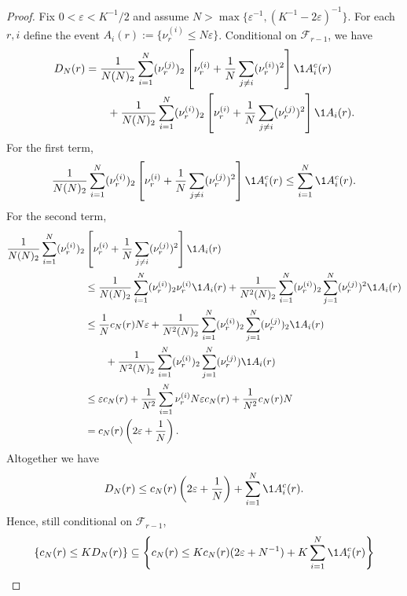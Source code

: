 \begin{proof}
Fix $0 < \varepsilon < K^{-1}/2$ and assume $N > \max\{ \varepsilon^{-1}, (K^{-1} - 2\varepsilon)^{-1} \}$. For each $r,i$ define the event $A_i(r) := \{ \nu_r^{(i)} \leq N\varepsilon \}$.
Conditional on $\mathcal{F}_{r-1}$, we have
\begin{align*}
D_N(r)
&= \frac{1}{N(N)_2} \sum_{i=1}^N (\nu_r^{(j)})_2 \left[ \nu_r^{(i)} 
        + \frac{1}{N} \sum_{j\neq i} (\nu_r^{(i)})^2 \right] \1{A_i^c(r)} \\
    &\qquad+ \frac{1}{N(N)_2} \sum_{i=1}^N (\nu_r^{(i)})_2 \left[ \nu_r^{(i)} 
        + \frac{1}{N} \sum_{j\neq i} (\nu_r^{(j)})^2 \right] \1{A_i(r)} .
\end{align*}
For the first term, 
\begin{equation*}
\frac{1}{N(N)_2} \sum_{i=1}^N (\nu_r^{(i)})_2 \left[ \nu_r^{(i)} 
        + \frac{1}{N} \sum_{j\neq i} (\nu_r^{(j)})^2 \right] \1{A_i^c(r)}
\leq \sum_{i=1}^N \1{A_i^c(r)} .
\end{equation*}
For the second term,
\begin{align*}
\frac{1}{N(N)_2} \sum_{i=1}^N (\nu_r^{(i)})_2 &\left[ \nu_r^{(i)} 
        + \frac{1}{N} \sum_{j\neq i} (\nu_r^{(j)})^2 \right] \1{A_i(r)} \\
&\leq \frac{1}{N(N)_2} \sum_{i=1}^N (\nu_r^{(i)})_2 \nu_r^{(i)} \1{A_i(r)} 
        + \frac{1}{N^2(N)_2} \sum_{i=1}^N (\nu_r^{(i)})_2 \sum_{j=1}^N 
        (\nu_r^{(j)})^2 \1{A_i(r)} \\
&\leq \frac{1}{N} c_N(r) N\varepsilon
        + \frac{1}{N^2(N)_2} \sum_{i=1}^N (\nu_r^{(i)})_2 \sum_{j=1}^N 
        (\nu_r^{(j)})_2 \1{A_i(r)} \\
    &\qquad+ \frac{1}{N^2(N)_2} \sum_{i=1}^N (\nu_r^{(i)})_2 \sum_{j=1}^N 
        (\nu_r^{(j)}) \1{A_i(r)} \\
&\leq \varepsilon c_N(r) 
        + \frac{1}{N^2} \sum_{i=1}^N \nu_r^{(i)} N\varepsilon c_N(r) 
        + \frac{1}{N^2} c_N(r) N \\
&= c_N(r) \left( 2\varepsilon + \frac{1}{N} \right).
\end{align*}
Altogether we have
\begin{equation*}
D_N(r) 
\leq c_N(r) \left( 2\varepsilon + \frac{1}{N} \right)
        + \sum_{i=1}^N \1{A_i^c(r)} .
\end{equation*}
Hence, still conditional on $\mathcal{F}_{r-1}$,
\begin{align*}
\left\{ c_N(r) \leq K D_N(r) \right\}
&\subseteq \left\{ c_N(r) \leq K c_N(r) (2\varepsilon + N^{-1}) 
        + K \sum_{i=1}^N \1{A_i^c(r)} \right\} \\

\end{align*}
\end{proof}
